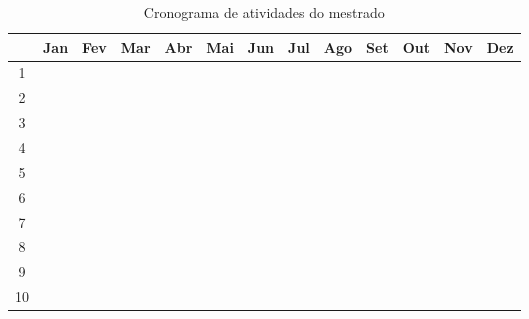 
\begin{table}[h]
\centering
\caption{Cronograma de atividades do mestrado}
\begin{tabular}{c|c|c|c|c|c|c|c|c|c|c|c|c}
 \hline
  & Jan & Fev & Mar & Abr & Mai & Jun & Jul & Ago & Set & Out & Nov & Dez \\
 \hline
 1 & \cellcolor{gray} & \cellcolor{gray} & & & & & & & & & & \\
 \hline
 2 & & \cellcolor{gray} & \cellcolor{gray} & & & & & & & & &  \\
 \hline
 3 & & \cellcolor{gray} & \cellcolor{gray} & \cellcolor{gray} & & & & & & & & \\
 \hline
 4 & & & & \cellcolor{gray} & \cellcolor{gray} & & & & & & & \\
 \hline
 5 & & & & & & \cellcolor{gray} & & & & & & \\
 \hline
 6 & & & & & & & \cellcolor{gray} & & & & \\
 \hline
 7 & & & & & & & \cellcolor{gray} & \cellcolor{gray} & \cellcolor{gray} & & & \\
 \hline
 8 & & & & & & & & \cellcolor{gray} & \cellcolor{gray} & \cellcolor{gray} & & \\
 \hline
 9 & & & & & & & & & & \cellcolor{gray} & \cellcolor{gray} & \cellcolor{gray} \\
 \hline
 10 & & & & & & & & & & & & \cellcolor{gray} \\
 \hline
\end{tabular}
\end{table}

